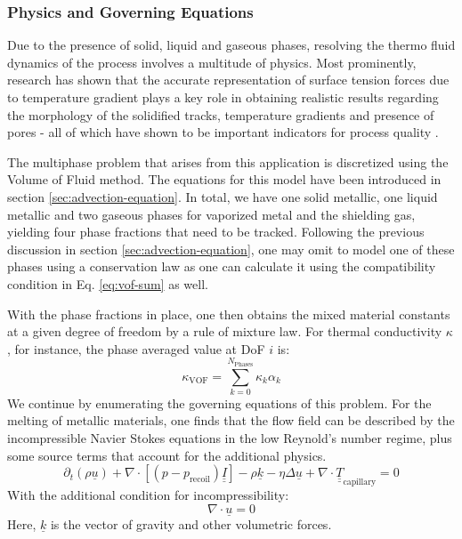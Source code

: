 \documentclass[asi,article,submit,moreauthors]{Definitions/mdpi}
\begin{document}
\subsubsection{Physics and Governing Equations}

Due to the presence of solid, liquid and gaseous phases, resolving the thermo fluid dynamics of the process involves a multitude of physics.
Most prominently, research has shown that the accurate representation of surface tension forces due to temperature gradient plays a key role in obtaining realistic results regarding the morphology of the solidified tracks, temperature gradients and presence of pores - all of which have shown to be important indicators for process quality \cite{debroyAdditiveManufacturingMetallic2018}.

The multiphase problem that arises from this application is discretized using the Volume of Fluid method.
The equations for this model have been introduced in section \ref{sec:advection-equation}.
In total, we have one solid metallic, one liquid metallic and two gaseous phases for vaporized metal and the shielding gas, yielding four phase fractions that need to be tracked.
Following the previous discussion in section \ref{sec:advection-equation}, one may omit to model one of these phases using a conservation law as one can calculate it using the compatibility condition in Eq. \ref{eq:vof-sum} as well.

With the phase fractions in place, one then obtains the mixed material constants at a given degree of freedom by a rule of mixture law.
For thermal conductivity $\kappa$, for instance, the phase averaged value at DoF $i$ is:
\begin{equation}
    \kappa_\text{VOF} = \sum\limits_{k=0}^{N_\text{Phases}} \kappa_k \alpha_k
\end{equation}
We continue by enumerating the governing equations of this problem.
For the melting of metallic materials, one finds that the flow field can be described by the incompressible Navier Stokes equations in the low Reynold's number regime, plus some source terms that account for the additional physics.
\begin{equation}\label{eq:momentum-balance}
    \partial_t (\rho \underline{u}) + \nabla \cdot \left[\left(p - p_\text{recoil}\right) \underline{\underline{I}}\right] - \rho \underline{k} - \eta \Delta \underline{u} + \nabla \cdot \underline{\underline{T}}_\text{capillary}  = 0
\end{equation}
With the additional condition for incompressibility:
\begin{equation}\label{eq:continuity}
    \nabla \cdot \underline{u} = 0
\end{equation}
Here, $\underline{k}$ is the vector of gravity and other volumetric forces.
\end{document}
